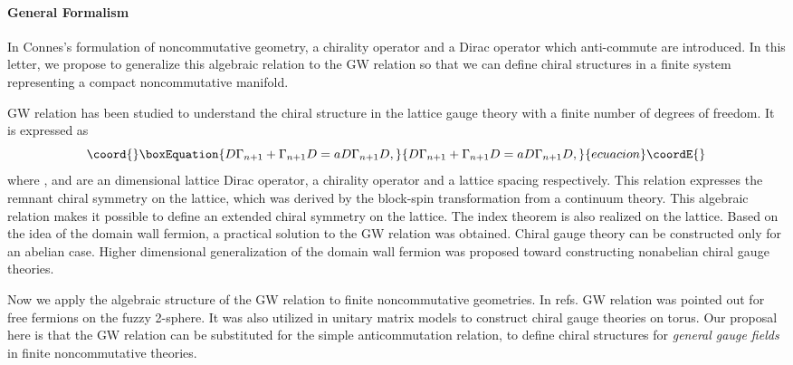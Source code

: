 \documentclass[a4paper,prl,showpacs,twocolumn]{revtex4}
\begin{document}
\paragraph{{\bf General Formalism}} 
In Connes's formulation of noncommutative geometry, 
a chirality operator and a Dirac operator which anti-commute 
are introduced.
In this letter, we propose to generalize 
this algebraic relation to the GW relation so that we can 
define chiral structures 
in a finite system representing a compact noncommutative manifold.
\par
GW relation has been studied to understand the chiral structure
in the lattice gauge theory with  a finite number of degrees of freedom.
It is expressed as 
\begin{equation}\coord{}\boxEquation{
D\Gamma_{n+1} + \Gamma_{n+1} D =a  D \Gamma_{n+1} D,
\label{GWintro}
}{
D\Gamma_{n+1} + \Gamma_{n+1} D =a  D \Gamma_{n+1} D,
}{ecuacion}\coordE{}\end{equation}
where \coordHE{}, \coordHE{} and \coordHE{} are  an \coordHE{} dimensional 
lattice Dirac operator, a chirality operator and a lattice spacing
respectively.
This relation expresses the remnant chiral symmetry 
on the lattice, which was derived by  
the block-spin transformation
from a continuum theory\cite{GinspargWilson}. 
This algebraic relation makes it possible to define an extended chiral 
symmetry on the lattice\cite{Luscher,Nieder}. 
The index theorem  is also realized on the
lattice\cite{Hasenfratzindex,Luscher}.
Based on the idea of the domain wall fermion, a practical 
solution to the GW relation was obtained\cite{Neuberger}. 
Chiral gauge theory can be  
constructed only for an abelian case\cite{abeliangauge}. 
Higher dimensional generalization of the domain wall 
fermion was proposed toward constructing nonabelian 
chiral gauge theories\cite{KN}.
\par
Now we apply the algebraic structure of the GW relation to
finite noncommutative geometries.
In refs.\cite{balaGW} GW relation was pointed out 
for free fermions on the fuzzy 2-sphere.
It was also utilized in unitary matrix models to construct 
chiral gauge theories on torus\cite{Nishi}. 
Our proposal here is that the GW relation can be 
substituted for the simple anticommutation relation, 
to define chiral structures for {\it general gauge fields} 
in finite noncommutative theories.
\end{document}
